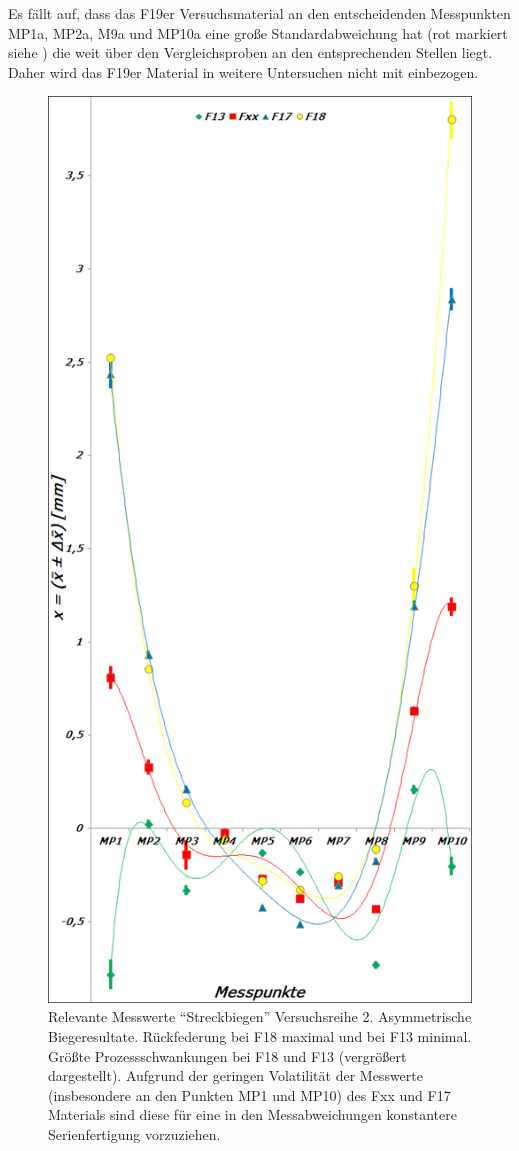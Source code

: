 \documentclass[12pt,a4paper,parskip,twoside,BCOR5mm,headsepline]{scrartcl}
\begin{document}
Es fällt auf, dass das F19er Versuchsmaterial an den entscheidenden Messpunkten MP1a, MP2a, M9a und MP10a eine große Standardabweichung hat (rot markiert siehe ) die weit über den Vergleichsproben an den entsprechenden Stellen liegt. Daher wird das F19er Material in weitere Untersuchen nicht mit einbezogen.\\
\begin{figure}[hbtp]
\centering
\includegraphics[width=.8\textwidth]{messwerte2}
\caption{Relevante Messwerte "`Streckbiegen"' Versuchsreihe 2. Asymmetrische Biegeresultate. Rückfederung bei F18 maximal und bei F13 minimal.  Größte Prozessschwankungen bei F18 und F13 (vergrößert dargestellt). Aufgrund der geringen Volatilität der Messwerte (insbesondere an den Punkten MP1 und MP10) des Fxx und F17 Materials sind diese für eine in den Messabweichungen konstantere  Serienfertigung vorzuziehen.}
\label{fig:messw2}
\end{figure}
\end{document}
